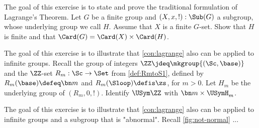 \begin{xca}\label{xca:lagrange}
The goal of this exercise is to state and prove the traditional
formulation of  Lagrange's Theorem. 
Let $G$ be a finite group and $(X,x,!):\Sub(G)$ a subgroup,
whose underlying group we call $H$. 
Assume that $X$ is a finite $G$-set. Show that $H$ is finite and
that $\Card(G) = \Card(X) \times \Card(H)$.
\end{xca}

\begin{xca}\label{xca:lagrange-Z-action-Rm}
The goal of this exercise is to illustrate that \cref{con:lagrange}
also can be applied to infinite groups. 
Recall the group of integers $\ZZ\jdeq\mkgroup{(\Sc,\base)}$ and the $\ZZ$-set
$R_m: \Sc\to\Set$ from \cref{def:RmtoS1}, defined by $R_m(\base) \defeq \bn m$
and $R_m(\Sloop) \defis \zs$, for $m>0$. Let $H_m$ be the underlying group
of $(R_m,0,!)$. Identify $\USym\ZZ$ with $\bn m \times \USymH_m$.
\end{xca}

\begin{xca}\label{xca:lagrange-if-subgr-not-normal}
The goal of this exercise is to illustrate that \cref{con:lagrange}
also can be applied to infinite groups and a subgroup that is "abnormal".
Recall \cref{fig:not-normal} ...
\end{xca}







